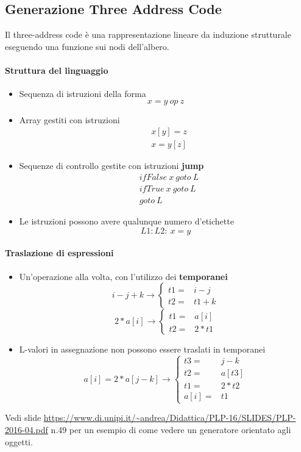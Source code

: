 \subsection{Generazione Three Address Code}
Il three-address code è una rappresentazione lineare da induzione strutturale
eseguendo una funzione sui nodi dell'albero.
\paragraph{Struttura del linguaggio}
\begin{itemize}
\item Sequenza di istruzioni della forma $$x = y \ op \ z$$
\item Array gestiti con istruzioni
\begin{align*}
& x[y] = z \\
& x = y[z]
\end{align*}
\item Sequenze di controllo gestite con istruzioni \textbf{jump}
\begin{align*}
& ifFalse \ x \ goto \ L \\
& ifTrue \ x \ goto \ L \\
& goto \ L
\end{align*}
\item Le istruzioni possono avere qualunque numero d'etichette
$$L1:L2: \ x = y$$
\end{itemize}

\paragraph{Traslazione di espressioni}
\begin{itemize}
\item Un'operazione alla volta, con l'utilizzo dei \textbf{temporanei}
$$
i - j + k \to \left\{
\begin{array}{lr}
  t1 = & i - j \\
  t2 = & t1 + k
\end{array}
\right.
$$
$$
2 * a[i] \to \left\{
\begin{array}{lr}
  t1 = & a[i] \\
  t2 = & 2 * t1
\end{array}
\right.
$$
\item L-valori in assegnazione non possono essere traslati in temporanei
$$
a[i] = 2 * a[j-k] \to \left\{
\begin{array}{lr}
  t3   = & j - k \\
  t2   = & a[t3] \\
  t1   = & 2 * t2 \\
  a[i] = & t1
\end{array}
\right.
$$
\end{itemize}

Vedi slide
\url{https://www.di.unipi.it/~andrea/Didattica/PLP-16/SLIDES/PLP-2016-04.pdf}
n.49 per un esempio di come vedere un generatore orientato agli oggetti.
